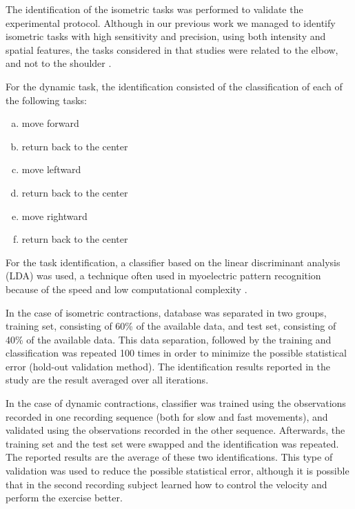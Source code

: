The identification of the isometric tasks was performed to validate the experimental protocol. Although in our previous work we managed to identify isometric tasks with high sensitivity and precision, using both intensity and spatial features, the tasks considered in that studies were related to the elbow, and not to the shoulder \citep{Jordanic2016a, Jordanic2016b, Rojas-Martinez2013}.

For the dynamic task, the identification consisted of the classification of each of the following tasks:
 
\begin{enumerate}[a)]
\item move forward
\item return back to the center
\item move leftward
\item return back to the center
\item move rightward
\item return back to the center
\end{enumerate}

For the task identification, a classifier based on the linear discriminant analysis (LDA) was used, a technique often used in myoelectric pattern recognition because of the speed and low computational complexity \citep{Zhou2007}.

In the case of isometric contractions, database was separated in two groups, training set, consisting of 60\% of the available data, and test set, consisting of 40\% of the available data. This data separation, followed by the training and classification was repeated 100 times in order to minimize the possible statistical error (hold-out validation method). The identification results reported in the study are the result averaged over all iterations.

In the case of dynamic contractions, classifier was trained using the observations recorded in one recording sequence (both for slow and fast movements), and validated using the observations recorded in the other sequence. Afterwards, the training set and the test set were swapped and the identification was repeated. The reported results are the average of these two identifications. This type of validation was used to reduce the possible statistical error, although it is possible that in the second recording subject learned how to control the velocity and perform the exercise better.

